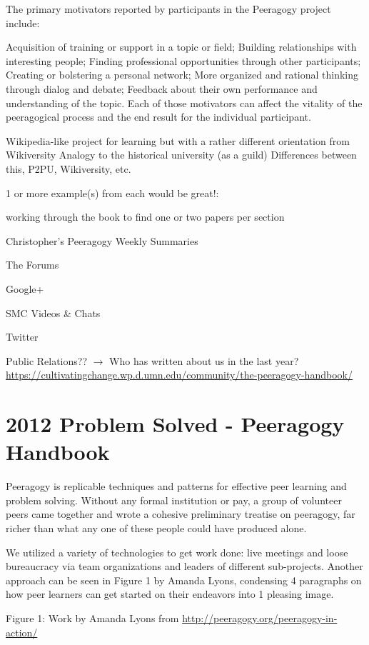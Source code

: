 \documentclass{acm_proc_article-sp}
\begin{document}
The primary motivators reported by participants in the Peeragogy project include:

Acquisition of training or support in a topic or field;
Building relationships with interesting people;
Finding professional opportunities through other participants;
Creating or bolstering a personal network;
More organized and rational thinking through dialog and debate;
Feedback about their own performance and understanding of the topic.
Each of those motivators can affect the vitality of the peeragogical process and the end result for the individual participant.

Wikipedia-like project for learning
but with a rather different orientation from Wikiversity
Analogy to the historical university (as a guild)
Differences between this, P2PU, Wikiversity, etc.

    1 or more example(s) from each would be great!:

        working through the book to find one or two papers per section

        Christopher's Peeragogy Weekly Summaries

        The Forums

        Google+

        SMC Videos \& Chats

        Twitter

    Public Relations?? $\rightarrow$ Who has written about us in the last year?\url{https://cultivatingchange.wp.d.umn.edu/community/the-peeragogy-handbook/}


\section{2012 Problem Solved - Peeragogy Handbook}

Peeragogy is replicable techniques and patterns for effective peer learning and problem solving. Without any formal institution or pay, a group of volunteer peers came together and wrote a cohesive preliminary treatise on peeragogy, far richer than what any one of these people could have produced alone.

We utilized a variety of technologies to get work done: live meetings and loose bureaucracy via team organizations and leaders of different sub-projects. Another approach can be seen in Figure 1 by Amanda Lyons, condensing 4 paragraphs on how peer learners can get started on their endeavors into 1 pleasing image. 

Figure 1: Work by Amanda Lyons from \url{http://peeragogy.org/peeragogy-in-action/}
\end{document}
